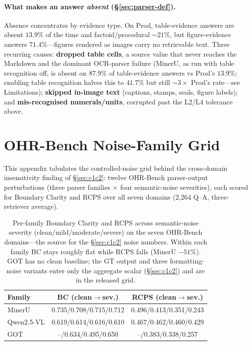\documentclass[11pt]{article}
\newcommand{\rcps}{\textsc{RCPS}}
\begin{document}
\paragraph{What makes an answer \emph{absent} (\S\ref{sec:parser-def}).} Absence concentrates by evidence type. On Prod, table-evidence answers are absent $13.9\%$ of the time and factoid/procedural $\sim\!21\%$, but figure-evidence answers $71.4\%$---figures rendered as images carry no retrievable text. Three recurring causes: \textbf{dropped table cells}, a source value that never reaches the Markdown and the dominant OCR-parser failure (MinerU, as run with table recognition off, is absent on $87.9\%$ of table-evidence answers vs Prod's $13.9\%$; enabling table recognition halves this to $41.7\%$ but still $\sim\!3\times$ Prod's rate---see Limitations); \textbf{skipped in-image text} (captions, stamps, seals, figure labels); and \textbf{mis-recognised numerals/units}, corrupted past the L2/L4 tolerance above.

\section{OHR-Bench Noise-Family Grid}
\label{app:noise}

This appendix tabulates the controlled-noise grid behind the cross-domain insensitivity finding of \S\ref{sec:c1c2}: twelve OHR-Bench parser-output perturbations (three parser families $\times$ four semantic-noise severities), each scored for Boundary Clarity and \rcps{} over all seven domains (2{,}264 Q--A, three-retriever average).

\begin{table}[h]
\centering\scriptsize
\setlength{\tabcolsep}{1pt}
\begin{tabular}{lcc}
\toprule
Family & BC (clean$\to$sev.) & \rcps{} (clean$\to$sev.) \\
\midrule
MinerU & 0.735/0.708/0.715/0.712 & 0.496/0.413/0.351/0.243 \\
Qwen2.5-VL & 0.619/0.614/0.616/0.610 & 0.467/0.462/0.460/0.429 \\
GOT & --/0.634/0.495/0.650 & --/0.383/0.338/0.257 \\
\bottomrule
\end{tabular}
\caption{Per-family Boundary Clarity and \rcps{} across semantic-noise severity (clean/mild/moderate/severe) on the seven OHR-Bench domains---the source for the \S\ref{sec:c1c2} noise numbers. Within each family BC stays roughly flat while \rcps{} falls (MinerU $-51\%$). GOT has no clean baseline; the GT output and three formatting-noise variants enter only the aggregate scalar (\S\ref{sec:c1c2}) and are in the released grid.}
\label{tab:noise}
\end{table}
\end{document}
